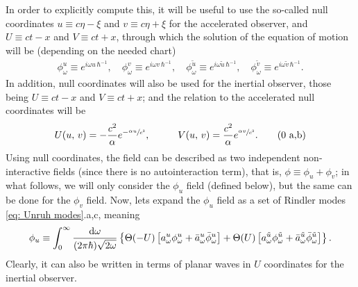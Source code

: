 In order to explicitly compute this, it will be useful to use the so-called null coordinates $u\equiv c\eta-\xi$ and $v\equiv c\eta+\xi$ for the accelerated observer, and  $U\equiv ct-x$ and $V\equiv ct+x$, through which the solution of the equation of motion will be (depending on the needed chart)
\begin{subequations}\label{eq: Unruh modes}
	\begin{gather}
		\phi_\omega^u\equiv e^{i\omega u\,\hbar^{-1}},\quad \phi_\omega^v\equiv  e^{i\omega v\,\hbar^{-1}},\quad\phi_\omega^{\tilde u}\equiv e^{i\omega \tilde u\,\hbar^{-1}},\quad\phi_\omega^{\tilde v}\equiv  e^{i\omega \tilde v\,\hbar^{-1}}.\tag{\theequation \,\,a-d}
	\end{gather}
\end{subequations}
In addition, null coordinates will also be used for the inertial observer, those being $U\equiv ct-x$ and $V\equiv ct+x$; and the relation to the accelerated null coordinates will be
\begin{subequations}\label{eq: Unruh Null coordinates relation}
	\begin{gather}
		U(u,\,v)=-\frac{c^2}{\alpha}e^{-\sfrac{\alpha u}{c^2}},\hspace{1.0cm} V(u,\,v)=\frac{c^2}{\alpha}e^{\sfrac{\alpha v}{c^2}}.\tag{\theequation \,\,a,b}
	\end{gather}
\end{subequations}
Using null coordinates, the field can be described as two independent non-interactive fields (since there is no autointeraction term), that is, $\phi\equiv\phi_u+\phi_v$; in what follows, we will only consider the $\phi_u$ field (defined below), but the same can be done for the $\phi_v$ field. Now, lets expand the $\phi_u$ field as a set of Rindler modes \ref{eq: Unruh modes}.a,c, meaning
\begin{equation}
	\phi_u\equiv\int_0^\infty \frac{\text{d} \omega}{(2\pi\hbar)\sqrt{2\omega}}\left\{\Theta(-U)\left[a^u_\omega\phi_\omega^u+\bar a^u_\omega\bar \phi_\omega^u \right]+\Theta(U)\left[a^{\tilde u}_\omega\phi_\omega^{\tilde u}+\bar a^{\tilde u}_\omega\bar \phi_\omega^{\tilde u} \right]\right\}.
\end{equation}
Clearly, it can also be written in terms of planar waves in $U$ coordinates for the inertial observer.

